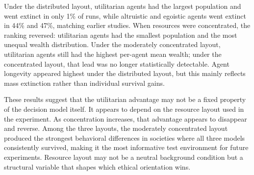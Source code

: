 \documentclass{icsthesis}
\begin{document}
\begin{frontmatter}
\begin{abstractwithpageno}
Under the distributed layout, utilitarian agents had the largest population and went extinct in only 1\% of runs, while altruistic and egoistic agents went extinct in 44\% and 47\%, matching earlier studies. When resources were concentrated, the ranking reversed: utilitarian agents had the smallest population and the most unequal wealth distribution. Under the moderately concentrated layout, utilitarian agents still had the highest per-agent mean wealth; under the concentrated layout, that lead was no longer statistically detectable. Agent longevity appeared highest under the distributed layout, but this mainly reflects mass extinction rather than individual survival gains.

These results suggest that the utilitarian advantage may not be a fixed property of the decision model itself. It appears to depend on the resource layout used in the experiment. As concentration increases, that advantage appears to disappear and reverse. Among the three layouts, the moderately concentrated layout produced the strongest behavioral differences in societies where all three models consistently survived, making it the most informative test environment for future experiments. Resource layout may not be a neutral background condition but a structural variable that shapes which ethical orientation wins.
\end{abstractwithpageno}

	\end{frontmatter}
	
\end{document}
